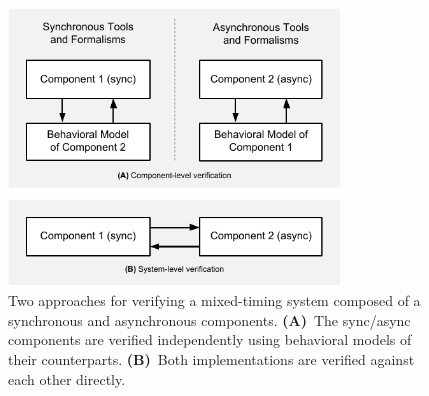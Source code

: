 
\begin{figure}[!t]
\begin{center}

\includegraphics[width=8.8cm]{figures/fig_overview}

\caption{
Two approaches for verifying a mixed-timing system composed of a synchronous and asynchronous components. \textbf{(A)}~The sync/async components are verified independently using behavioral models of their counterparts. \textbf{(B)}~Both implementations are verified against each other directly.
}

\label{fig_overview}
\end{center}

\end{figure}
